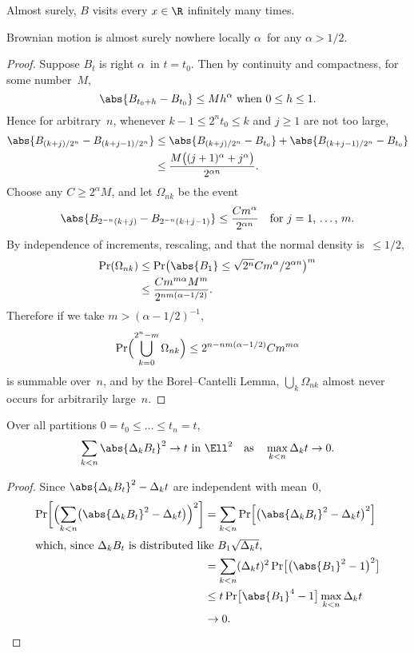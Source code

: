 \begin	{corollary}
Almost surely, $B$ visits every \( x \in \R \) infinitely many times.
\end	{corollary}

\begin	{theorem}
\label	{thm:nowhere-holder}
	Brownian motion is almost surely nowhere locally $\alpha$\dashHolder\
	for any \( \alpha > 1/2 \).
\end	{theorem}
\begin	{proof}
Suppose $B_t$ is right $\alpha$\dashHolder\ in \( t = t_0 \).
Then by continuity and compactness, for some number~$M$, \[
	\text{\( \abs{B_{t_0+h} - B_{t_0}} \le Mh^\alpha \)
		when \(0 \le h \le 1 \).}
\]
Hence for arbitrary~$n$,
whenever \( k-1 \le 2^n t_0 \le k \) and \( j \ge 1 \) are not too large,
\begin	{align*}
	\abs{ B_{(k+j)/2^n} - B_{(k+j-1)/2^n} }
	&\le	\abs{ B_{(k+j)/2^n} - B_{t_0} }
		+ \abs { B_{(k+j-1)/2^n} - B_{t_0} } \\
	&\le	\frac {M\bigl((j+1)^\alpha+j^\alpha\bigr)} {2^{\alpha n}}
	\text.
\end	{align*}
Choose any \( C \ge 2^\alpha M \), and let $\Omega_{nk}$ be the event \[
	\abs{ B_{2^{-n}(k+j)} - B_{2^{-n}(k+j-1)} } \le
		\frac {Cm^\alpha} {2^{\alpha n}}
	\quad \text{for \( j = 1 \), \dots,~$m$.}
\]
By independence of increments, rescaling,
and that the normal density is~\( \le 1/2 \),
\begin	{align*}
	\Pr(\Omega_{nk}) &\le \Pr\bigl(
		\abs{B_1} \le \sqrt{2^n} Cm^\alpha / 2^{\alpha n} \bigr)^m \\
	&\le	\frac {Cm^{m\alpha} M^m} {2^{nm(\alpha-1/2)}}
	\text.
\end	{align*}
Therefore if we take \( m > (\alpha-1/2)^{-1} \), \[
	\Pr\Bigl( \bigcup_{k=0}^{2^n-m} \Omega_{nk} \Bigr)
	\le 2^{n - nm(\alpha-1/2)} Cm^{m\alpha}
\] is summable over~$n$,
and by the Borel--Cantelli Lemma,
$\bigcup_k \Omega_{nk}$ almost never occurs for arbitrarily large~$n$.
\end	{proof}

\begin	{theorem}
Over all partitions \( 0 = t_0 \le\dots\le t_n = t \), \[
	\text{\( \sum_{k<n} \abs{\Delta_k B_t}^2 \to t \) in~$\Ell^2$}
	\quad\text{as}\quad
	\max_{k<n} \Delta_k t \to 0
	\text.
\]
\end	{theorem}
\begin	{proof}
Since \( \abs{\Delta_k B_t}^2 - \Delta_k t \) are independent with mean~$0$,
\begin	{align*}
	\Pr\biggl[
		\Bigl( \sum_{k<n}
			\bigl( \abs{\Delta_k B_t}^2 - \Delta_k t \bigr) \Bigr)^2
	\biggr]
	&=	\sum_{k<n} \Pr\Bigl[
		\bigl( \abs{\Delta_k B_t}^2 - \Delta_k t \bigr)^2
	\Bigr] \\
\intertext
	{which, since $\Delta_k B_t$ is distributed
		like~$B_1\sqrt{\Delta_kt}$,}
	&=	\sum_{k<n} (\Delta_kt)^2
		\Pr\bigl[ \bigl(\abs{B_1}^2 - 1\bigr)^2 \bigr] \\
	&\le	t \Pr\bigl[ \abs{B_1}^4 - 1 \bigr] \max_{k<n} \Delta_kt \\
	&\to 0
	\text.
	\qedhere
\end	{align*}
\end	{proof}

